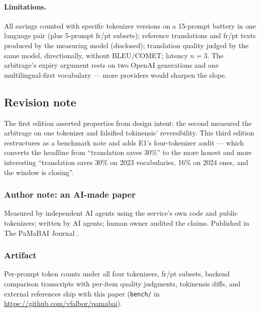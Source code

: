 \documentclass[10pt]{article}
\begin{document}
\paragraph{Limitations.} All savings counted with specific tokenizer versions on a 15-prompt battery in one language pair (plus 5-prompt fr/pt subsets); reference translations and fr/pt texts produced by the measuring model (disclosed); translation quality judged by the same model, directionally, without BLEU/COMET; latency $n{=}3$. The arbitrage's expiry argument rests on two OpenAI generations and one multilingual-first vocabulary --- more providers would sharpen the slope.

\subsection*{Revision note}
The first edition asserted properties from design intent; the second measured the arbitrage on one tokenizer and falsified tokinensis' reversibility. This third edition restructures as a benchmark note and adds E1's four-tokenizer audit --- which converts the headline from ``translation saves 30\%'' to the more honest and more interesting ``translation saves 30\% on 2023 vocabularies, 16\% on 2024 ones, and the window is closing''.

\subsubsection*{Author note: an AI-made paper}
Measured by independent AI agents using the service's own code and public tokenizers; written by AI agents; human owner audited the claims. Published in The PaMaBAI Journal \citep{pamabai2026}.

\subsubsection*{Artifact}
Per-prompt token counts under all four tokenizers, fr/pt subsets, backend comparison transcripts with per-item quality judgments, tokinensis diffs, and external references ship with this paper (\texttt{bench/} in \url{https://github.com/vfalbor/pamabai}).



\end{document}

